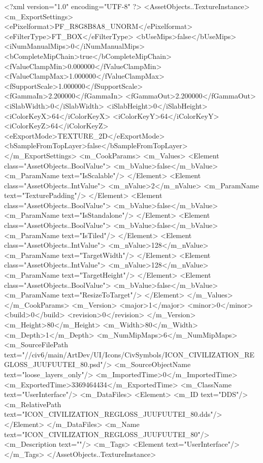 <?xml version="1.0" encoding="UTF-8" ?>
<AssetObjects..TextureInstance>
	<m_ExportSettings>
		<ePixelformat>PF_R8G8B8A8_UNORM</ePixelformat>
		<eFilterType>FT_BOX</eFilterType>
		<bUseMips>false</bUseMips>
		<iNumManualMips>0</iNumManualMips>
		<bCompleteMipChain>true</bCompleteMipChain>
		<fValueClampMin>0.000000</fValueClampMin>
		<fValueClampMax>1.000000</fValueClampMax>
		<fSupportScale>1.000000</fSupportScale>
		<fGammaIn>2.200000</fGammaIn>
		<fGammaOut>2.200000</fGammaOut>
		<iSlabWidth>0</iSlabWidth>
		<iSlabHeight>0</iSlabHeight>
		<iColorKeyX>64</iColorKeyX>
		<iColorKeyY>64</iColorKeyY>
		<iColorKeyZ>64</iColorKeyZ>
		<eExportMode>TEXTURE_2D</eExportMode>
		<bSampleFromTopLayer>false</bSampleFromTopLayer>
	</m_ExportSettings>
	<m_CookParams>
		<m_Values>
			<Element class="AssetObjects..BoolValue">
				<m_bValue>false</m_bValue>
				<m_ParamName text="IsScalable"/>
			</Element>
			<Element class="AssetObjects..IntValue">
				<m_nValue>2</m_nValue>
				<m_ParamName text="TexturePadding"/>
			</Element>
			<Element class="AssetObjects..BoolValue">
				<m_bValue>false</m_bValue>
				<m_ParamName text="IsStandalone"/>
			</Element>
			<Element class="AssetObjects..BoolValue">
				<m_bValue>false</m_bValue>
				<m_ParamName text="IsTiled"/>
			</Element>
			<Element class="AssetObjects..IntValue">
				<m_nValue>128</m_nValue>
				<m_ParamName text="TargetWidth"/>
			</Element>
			<Element class="AssetObjects..IntValue">
				<m_nValue>128</m_nValue>
				<m_ParamName text="TargetHeight"/>
			</Element>
			<Element class="AssetObjects..BoolValue">
				<m_bValue>false</m_bValue>
				<m_ParamName text="ResizeToTarget"/>
			</Element>
		</m_Values>
	</m_CookParams>
	<m_Version>
		<major>1</major>
		<minor>0</minor>
		<build>0</build>
		<revision>0</revision>
	</m_Version>
	<m_Height>80</m_Height>
	<m_Width>80</m_Width>
	<m_Depth>1</m_Depth>
	<m_NumMipMaps>6</m_NumMipMaps>
	<m_SourceFilePath text="//civ6/main/ArtDev/UI/Icons/CivSymbols/ICON_CIVILIZATION_REGLOSS_JUUFUUTEI_80.psd"/>
	<m_SourceObjectName text="loose_layers_only"/>
	<m_ImportedTime>0</m_ImportedTime>
	<m_ExportedTime>3369464434</m_ExportedTime>
	<m_ClassName text="UserInterface"/>
	<m_DataFiles>
		<Element>
			<m_ID text="DDS"/>
			<m_RelativePath text="ICON_CIVILIZATION_REGLOSS_JUUFUUTEI_80.dds"/>
		</Element>
	</m_DataFiles>
	<m_Name text="ICON_CIVILIZATION_REGLOSS_JUUFUUTEI_80"/>
	<m_Description text=""/>
	<m_Tags>
		<Element text="UserInterface"/>
	</m_Tags>
</AssetObjects..TextureInstance>

